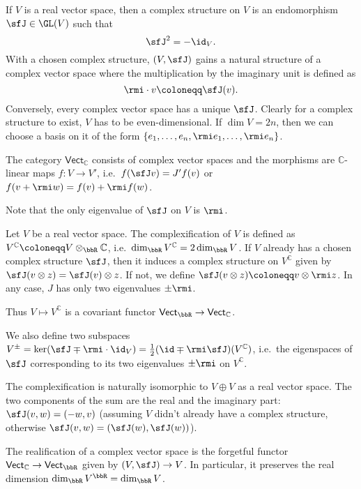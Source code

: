 \begin{defn}
    If $V$ is a real vector space, then a complex structure on $V$ is an endomorphism $\sfJ\in \GL(V)$ such that 
    \[\sfJ^2=-\id_V.\]
    With a chosen complex structure, $(V,\sfJ)$ gains a natural structure of a complex vector space where the multiplication by the imaginary unit is defined as
    \[\rmi\cdot v\coloneqq \sfJ(v).\]
    Conversely, every complex vector space has a unique $\sfJ$. Clearly for a complex structure to exist, $V$ has to be even-dimensional. If $\dim V=2n$, then we can choose a basis on it of the form $\{e_1,\ldots,e_n,\rmi e_1,\ldots,\rmi e_n\}$.
    
    The category $\mathsf{Vect}_{\mathbb{C}}$ consists of complex vector spaces and the morphisms are $\mathbb{C}$-linear maps $f:V\to V'$, i.e.\ $f(\sfJ v)=J' f(v)$ or $f(v+\rmi w)=f(v)+\rmi f(w)$.
\end{defn}

Note that the only eigenvalue of $\sfJ$ on $V$ is $\rmi$.

\begin{defn}[Complexification]
    Let $V$ be a real vector space. The complexification of $V$ is defined as $V^\mathbb{C}\coloneqq V\otimes_\bbR \mathbb{C}$, i.e.\ $\dim_\bbR V^\mathbb{C}=2\dim_\bbR V$. If $V$ already has a chosen complex structure $\sfJ$, then it induces a complex structure on $V^\mathbb{C}$ given by $\sfJ(v\otimes z)=\sfJ(v)\otimes z$. If not, we define $\sfJ(v\otimes z)\coloneqq v\otimes \rmi z$. In any case, $J$ has only two eigenvalues $\pm \rmi$.
    
    Thus $V\mapsto V^{\mathbb{C}}$ is a covariant functor $\mathsf{Vect}_\bbR \to \mathsf{Vect}_\mathbb{C}$.
    
    We also define two subspaces $V^\pm=\ker(\sfJ\mp \rmi\cdot\id_V)=\frac12(\id\mp \rmi \sfJ)(V^\mathbb{C})$, i.e.\ the eigenspaces of $\sfJ$ corresponding to its two eigenvalues $\pm \rmi$ on $V^\mathbb{C}$.
\end{defn}

The complexification is naturally isomorphic to $V\oplus V$ as a real vector space. The two components of the sum are the real and the imaginary part: $\sfJ(v,w)=(-w,v)$ (assuming $V$ didn't already have a complex structure, otherwise $\sfJ(v,w)=(\sfJ(w),\sfJ(w))$).


\begin{defn}[Realification]
    The realification of a complex vector space is the forgetful functor $\mathsf{Vect}_\mathbb{C}\to\mathsf{Vect}_\bbR $ given by $(V,\sfJ)\to V$. In particular, it preserves the real dimension $\dim_\bbR V^\bbR =\dim_\bbR V$.
\end{defn}

